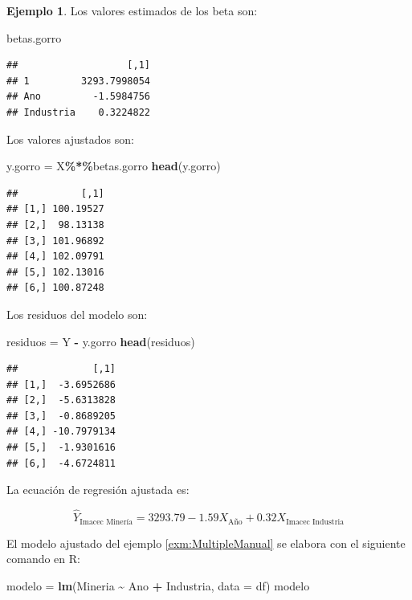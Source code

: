 \documentclass[
  11pt,
]{book}
\newenvironment{Shaded}{\begin{snugshade}}{\end{snugshade}}
\newcommand{\AttributeTok}[1]{\textcolor[rgb]{0.13,0.29,0.53}{#1}}
\newcommand{\FunctionTok}[1]{\textcolor[rgb]{0.13,0.29,0.53}{\textbf{#1}}}
\newcommand{\NormalTok}[1]{#1}
\newcommand{\OtherTok}[1]{\textcolor[rgb]{0.56,0.35,0.01}{#1}}
\newcommand{\SpecialCharTok}[1]{\textcolor[rgb]{0.81,0.36,0.00}{\textbf{#1}}}
\theoremstyle{definition}
\theoremstyle{definition}
\newtheorem{example}{Ejemplo}[chapter]
\theoremstyle{definition}
\theoremstyle{definition}
\theoremstyle{remark}
\begin{document}
\begin{example}
Los valores estimados de los beta son:

\begin{Shaded}
\begin{Highlighting}[]
\NormalTok{betas.gorro}
\end{Highlighting}
\end{Shaded}

\begin{verbatim}
##                   [,1]
## 1         3293.7998054
## Ano         -1.5984756
## Industria    0.3224822
\end{verbatim}

Los valores ajustados son:

\begin{Shaded}
\begin{Highlighting}[]
\NormalTok{y.gorro }\OtherTok{=}\NormalTok{ X}\SpecialCharTok{\%*\%}\NormalTok{betas.gorro}
\FunctionTok{head}\NormalTok{(y.gorro)}
\end{Highlighting}
\end{Shaded}

\begin{verbatim}
##           [,1]
## [1,] 100.19527
## [2,]  98.13138
## [3,] 101.96892
## [4,] 102.09791
## [5,] 102.13016
## [6,] 100.87248
\end{verbatim}

Los residuos del modelo son:

\begin{Shaded}
\begin{Highlighting}[]
\NormalTok{residuos }\OtherTok{=}\NormalTok{ Y }\SpecialCharTok{{-}}\NormalTok{ y.gorro}
\FunctionTok{head}\NormalTok{(residuos)}
\end{Highlighting}
\end{Shaded}

\begin{verbatim}
##             [,1]
## [1,]  -3.6952686
## [2,]  -5.6313828
## [3,]  -0.8689205
## [4,] -10.7979134
## [5,]  -1.9301616
## [6,]  -4.6724811
\end{verbatim}

La ecuación de regresión ajustada es:

\[
\widehat{Y}_{\text{Imacec Minería}} = 3293.79 -1.59X_{\text{Año}} + 0.32X_{\text{Imacec Industria}}
\]
\end{example}

El modelo ajustado del ejemplo \ref{exm:MultipleManual} se elabora con el siguiente comando en R:

\begin{Shaded}
\begin{Highlighting}[]
\NormalTok{modelo }\OtherTok{=} \FunctionTok{lm}\NormalTok{(Mineria }\SpecialCharTok{\textasciitilde{}}\NormalTok{ Ano }\SpecialCharTok{+}\NormalTok{ Industria, }\AttributeTok{data =}\NormalTok{ df)}
\NormalTok{modelo}
\end{Highlighting}
\end{Shaded}
\end{document}
